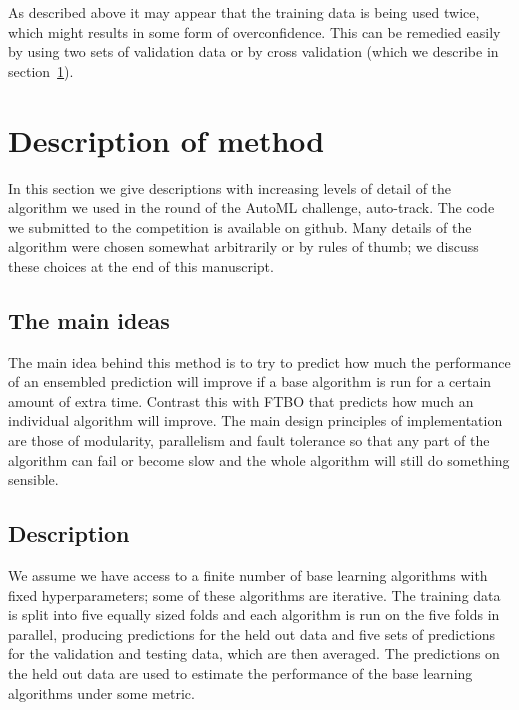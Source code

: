 \documentclass{article} %
\begin{document}

As described above it may appear that the training data is being used twice, which might results in some form of overconfidence.
This can be remedied easily by using two sets of validation data or by cross validation (which we describe in section~\ref{sec:method}).

\section{Description of method}
\label{sec:method}

In this section we give descriptions with increasing levels of detail of the algorithm we used in the  round of the AutoML challenge, auto-track.
The code we submitted to the competition is available on github\footnotemark{}.
Many details of the algorithm were chosen somewhat arbitrarily or by rules of thumb; we discuss these choices at the end of this manuscript.

\footnotetext{[Redacted]}

\subsection{The main ideas}

The main idea behind this method is to try to predict how much the performance of an ensembled prediction will improve if a base algorithm is run for a certain amount of extra time.
Contrast this with FTBO that predicts how much an individual algorithm will improve.
The main design principles of implementation are those of modularity, parallelism and fault tolerance so that any part of the algorithm can fail or become slow and the whole algorithm will still do something sensible.

\subsection{Description}

We assume we have access to a finite number of base learning algorithms with fixed hyperparameters; some of these algorithms are iterative.
The training data is split into five equally sized folds and each algorithm is run on the five folds in parallel, producing predictions for the held out data and five sets of predictions for the validation and testing data, which are then averaged.
The predictions on the held out data are used to estimate the performance of the base learning algorithms under some metric.
\end{document}
